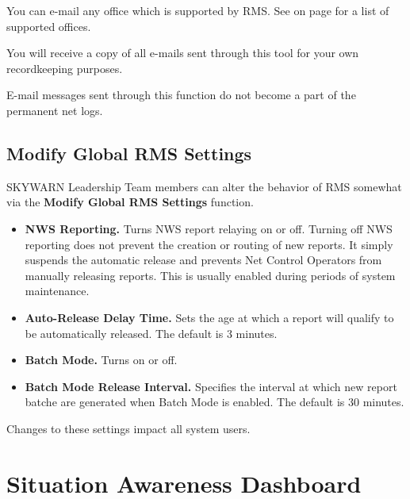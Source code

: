 \documentclass[pdflatex,letterpaper,twoside,12pt]{book}
\begin{document}
You can e-mail any office which is supported by RMS.  See  on page \pageref{rms-offices} for a list of supported offices.

You will receive a copy of all e-mails sent through this tool for your own recordkeeping purposes.

E-mail messages sent through this function do not become a part of the permanent net logs.


\section{Modify Global RMS Settings}\label{dash-rms-settings}

SKYWARN Leadership Team members can alter the behavior of RMS somewhat via the \textbf{Modify Global RMS Settings} function.

\begin{itemize}
\item \textbf{NWS Reporting.}  Turns NWS report relaying on or off.  Turning off NWS reporting does not prevent the creation or routing of new reports.  It simply suspends the automatic release and prevents Net Control Operators from manually releasing reports.  This is usually enabled during periods of system maintenance.
\item \textbf{Auto-Release Delay Time.}  Sets the age at which a report will qualify to be automatically released.  The default is 3 minutes.
\item \textbf{Batch Mode.}  Turns  on or off.
\item \textbf{Batch Mode Release Interval.}  Specifies the interval at which new report batche are generated when Batch Mode is enabled.  The default is 30 minutes.
\end{itemize}

Changes to these settings impact all system users.


\chapter{Situation Awareness Dashboard}\label{sit-dashboard}
\end{document}
